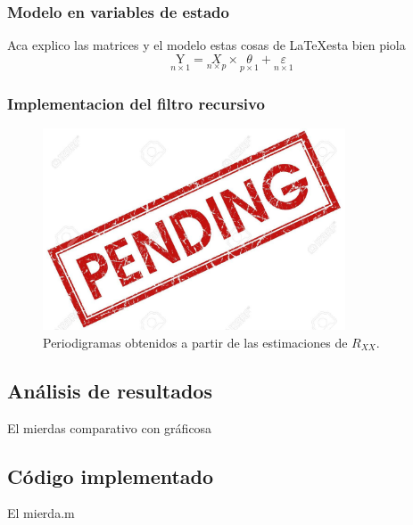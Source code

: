 \subsubsection{Modelo en variables de estado}
Aca explico las matrices y el modelo estas cosas de \LaTeX esta bien piola
\begin{equation}
\underset{n\times 1}{\mathrm{Y}} =  \underset{n\times p}{X} \times 
\underset{p\times 1}{\theta} + \underset{n\times 1}{\varepsilon}
\end{equation}

\subsubsection{Implementacion del filtro recursivo}

\begin{figure}[H]
\centering
	\includegraphics[width=0.8\textwidth, trim = {0 0 0 0.735cm},clip]{./Imagenes/pend.jpg}
	\caption{Periodigramas obtenidos a partir de las estimaciones de $R_{XX}$.}
	\label{fig:period-est}
\end{figure}



\subsection{Análisis de resultados}
El mierdas comparativo con gráficosa
\subsection{Código implementado}
El mierda.m
%	
%	
%	
%	
%	
%	
%	
%

